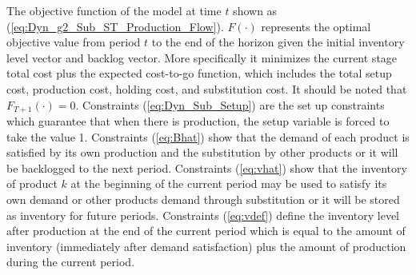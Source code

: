 \documentclass[10pt]{article}
\newcommand{\ti}{t} %
\newcommand{\Ti}{T}
\newcommand{\ka}{k} %
\newcommand{\KA}{\mathcal{K}}
\newcommand{\Bi}{B} %
\newcommand{\Vi}{v} %
\newcommand{\Es}{S} %
\newcommand{\InvPos}{inventory level after production }
\newcommand{\cn}{\mathcal{C}(n) }
\newcommand{\cred}{\color{red!65!black}}
\begin{document}


 The objective function of the model at time $\ti$ shown as (\ref{eq:Dyn_g2_Sub_ST_Production_Flow}). $F(\cdot) $ represents the optimal objective value from period $\ti$ to the end of the horizon given the initial inventory level vector and backlog vector. More specifically it minimizes the current stage total cost plus the expected cost-to-go function, which includes the total setup cost, production cost, holding cost, and substitution cost. 
 {\cred It should be noted that $F_{\Ti+1}(\cdot) =0$.}
Constraints (\ref{eq:Dyn_Sub_Setup}) are the set up constraints which guarantee that when there is production, the setup variable is forced to take the value 1. 
Constraints (\ref{eq:Bhat}) show that the demand of each product is satisfied by its own production and the substitution by other products or it will be backlogged to the next period.
Constraints (\ref{eq:vhat}) show that the inventory of product $\ka$ at the beginning of the current period may be used to satisfy its own demand or other products demand through substitution or it will be stored as inventory for future periods. 
Constraints (\ref{eq:vdef}) define the \InvPos at the end of the current period which is equal to the amount of inventory (immediately after demand satisfaction) plus the amount of production during the current period.
\end{document}
